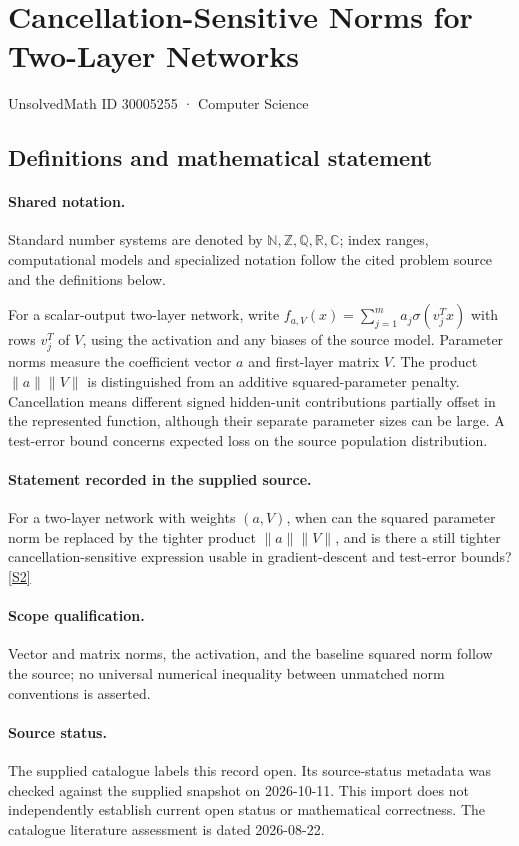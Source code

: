 \documentclass[11pt]{article}
\newcommand{\sref}[2]{\hyperlink{source:#1:#2}{[S#2]}}
\begin{document}
\setcounter{section}{30005254}
\section{Cancellation-Sensitive Norms for Two-Layer Networks}\label{30005255}
{\small\sffamily UnsolvedMath ID 30005255 · Computer Science}
\subsection{Definitions and mathematical statement}

\paragraph{Shared notation.}Standard number systems are denoted by $\mathbb N,\mathbb Z,\mathbb Q,\mathbb R,\mathbb C$; index ranges, computational models and specialized notation follow the cited problem source and the definitions below.


For a scalar-output two-layer network, write $f_{a,V}(x)=\sum_{j=1}^m a_j\sigma(v_j^Tx)$ with rows $v_j^T$ of $V$, using the activation and any biases of the source model. Parameter norms measure the coefficient vector $a$ and first-layer matrix $V$. The product $\lVert a\rVert\lVert V\rVert$ is distinguished from an additive squared-parameter penalty. Cancellation means different signed hidden-unit contributions partially offset in the represented function, although their separate parameter sizes can be large. A test-error bound concerns expected loss on the source population distribution.
\paragraph{Statement recorded in the supplied source.}
For a two-layer network with weights $(a,V)$, when can the squared parameter norm be replaced by the tighter product $\lVert a\rVert\lVert V\rVert$, and is there a still tighter cancellation-sensitive expression usable in gradient-descent and test-error bounds? \sref{30005255}{2}
\paragraph{Scope qualification.}
Vector and matrix norms, the activation, and the baseline squared norm follow the source; no universal numerical inequality between unmatched norm conventions is asserted.
\paragraph{Source status.}
The supplied catalogue labels this record open. Its source-status metadata was checked against the supplied snapshot on 2026-10-11. This import does not independently establish current open status or mathematical correctness. The catalogue literature assessment is dated 2026-08-22.
\end{document}
